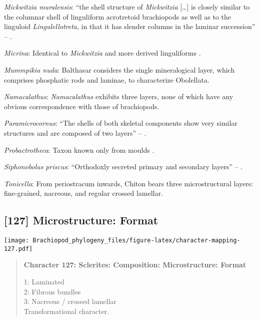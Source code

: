 \documentclass[openany]{book}
\theoremstyle{definition}
\theoremstyle{definition}
\theoremstyle{definition}
\theoremstyle{remark}
\begin{document}
\hypertarget{Mickwitzia_muralensis-coding-126}{}
\emph{Mickwitzia muralensis}: ``the shell structure of \emph{Mickwitzia}
{[}\ldots{}{]} is closely similar to the columnar shell of linguliform
acrotretoid brachiopods as well as to the linguloid
\emph{Lingulellotreta}, in that it has slender columns in the laminar
succession'' -- \citet{Williams2007Supplement}.

\hypertarget{Micrina-coding-126}{}
\emph{Micrina}: Identical to \emph{Mickwitzia} and more derived
linguliforms \citep{Holmer2011Firstrecord}.

\hypertarget{Mummpikia_nuda-coding-126}{}
\emph{Mummpikia nuda}: Balthasar \citeyearpar{Balthasar2008iMummpikia}
considers the single mineralogical layer, which comprises phosphatic
rods and laminae, to characterize Obolellata.

\hypertarget{Namacalathus-coding-126}{}
\emph{Namacalathus}: \emph{Namacalathus} exhibits three layers, none of
which have any obvious correspondence with those of brachiopods.

\hypertarget{Paramicrocornus-coding-126}{}
\emph{Paramicrocornus}: ``The shells of both skeletal components show
very similar structures and are composed of two layers'' --
\citet{Zhang2018Ahyolithid}.

\hypertarget{Probactrotheca-coding-126}{}
\emph{Probactrotheca}: Taxon known only from moulds \citep{Valent2012}.

\hypertarget{Siphonobolus_priscus-coding-126}{}
\emph{Siphonobolus priscus}: ``Orthodoxly secreted primary and secondary
layers'' -- \citet{Williams2004Chemicostructure}.

\hypertarget{Tonicella-coding-126}{}
\emph{Tonicella}: From periostracum inwards, Chiton bears three
microstructural layers: fine-grained, nacreous, and regular crossed
lamellar.

\subsection*{{[}127{]} Microstructure:
Format}\label{microstructure-format}

\texttt{[image: Brachiopod\_phylogeny\_files/figure-latex/character-mapping-127.pdf]}

\begin{quote}
\textbf{Character 127: Sclerites: Composition: Microstructure: Format}

1: Laminated\\
2: Fibrous bundles\\
3: Nacreous / crossed lamellar\\
Transformational character.
\end{quote}
\end{document}
